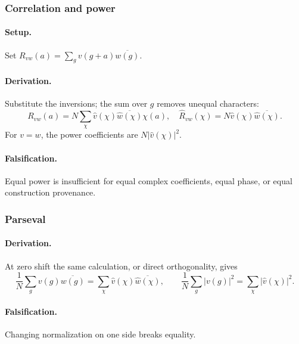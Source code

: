 
\subsubsection{Correlation and power}
\paragraph{Setup.}
Set \(R_{vw}(a)=\sum_g v(g+a)\overline{w(g)}\).
\paragraph{Derivation.} Substitute the inversions;
the sum over \(g\) removes unequal characters:
\begin{equation}
R_{vw}(a)=N\sum_\chi\widehat v(\chi)\overline{\widehat w(\chi)}\chi(a),
\quad \widehat R_{vw}(\chi)=N\widehat v(\chi)\overline{\widehat w(\chi)}.
\label{eq:fourier-correlation-power}
\end{equation}
For \(v=w\), the power coefficients are \(N|\widehat v(\chi)|^2\).
\paragraph{Falsification.} Equal power is insufficient for equal complex
coefficients, equal phase, or equal construction provenance.


\subsubsection{Parseval}
\paragraph{Derivation.}
At zero shift the same calculation, or direct orthogonality, gives
\begin{equation}
\frac1N\sum_g v(g)\overline{w(g)}
=\sum_\chi\widehat v(\chi)\overline{\widehat w(\chi)},
\qquad \frac1N\sum_g|v(g)|^2=\sum_\chi|\widehat v(\chi)|^2.
\label{eq:fourier-parseval}
\end{equation}
\paragraph{Falsification.} Changing normalization on one side breaks equality.

